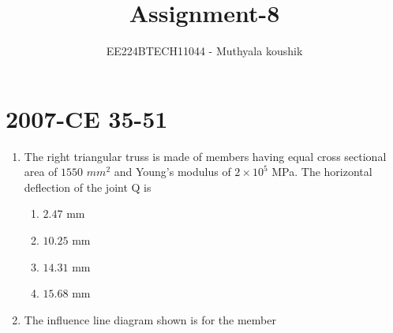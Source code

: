 \documentclass[journal,12pt,onecolumn]{IEEEtran}
\theoremstyle{remark}
\begin{document}

\vspace{3cm}

\title{Assignment-8}
\author{EE224BTECH11044 - Muthyala koushik
}
\maketitle
\bigskip

\renewcommand{\thefigure}{\theenumi}
\renewcommand{\thetable}{\theenumi}

\section{2007-CE 35-51}
\begin{enumerate}[start=35]
	\item The right triangular truss is made of members having equal cross sectional area of $1550$ $mm^{2}$ and Young's modulus of $2\times{10}^5$ MPa. The horizontal deflection of the joint Q is
\begin{figure}[h!]
    \centering
\end{figure}
		\begin{enumerate}
			\item $2.47$ mm
			\item $10.25$ mm
			\item $14.31$ mm
			\item $15.68$ mm\\
		\end{enumerate}
	\item The influence line diagram  shown is for the member\\
\begin{figure}[H]
    \centering
\end{figure}


\end{enumerate}
\end{document}
